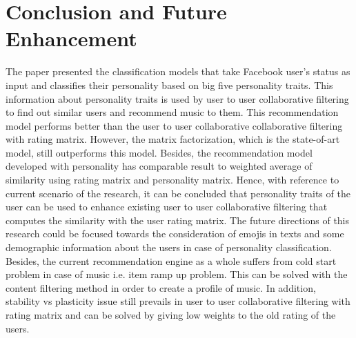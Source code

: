 \documentclass[conference]{IEEEtran}
\begin{document}
\section{Conclusion and Future Enhancement}
The paper presented the classification models that take Facebook user's status as input and classifies their personality based on big five personality traits. This information about personality traits is used by user to user collaborative filtering to find out similar users and recommend music to them. This recommendation model performs better than the user to user collaborative collaborative filtering with rating matrix. However, the matrix factorization, which is the state-of-art model, still outperforms this model. Besides, the recommendation model developed with personality has comparable result to weighted average of similarity using rating matrix and personality matrix. Hence, with reference to current scenario of the research, it can be concluded that personality traits of the user can be used to enhance existing user to user collaborative filtering that computes the similarity with the user rating matrix.
The future directions of this research could be focused towards the consideration of emojis in texts and some demographic information about the users in case of personality classification. Besides, the current recommendation engine as a whole suffers from cold start problem in case of music i.e. item ramp up problem. This can be solved with the content filtering method in order to create a profile of music. In addition, stability vs plasticity issue still prevails in user to user collaborative filtering with rating matrix and can be solved by giving low weights to the old rating of the users.

 



%
%
\end{document}

